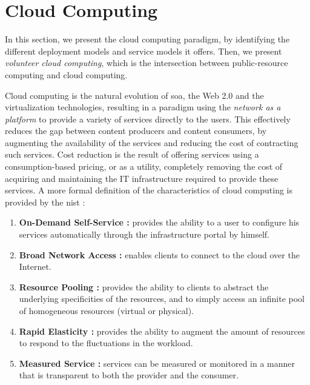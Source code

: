 \documentclass[12pt, titlepage]{uo_temp}
\begin{document}
     \section{Cloud Computing}
     In this section, we present the cloud computing paradigm, by identifying the
     different deployment models and service models it offers. Then, we present
     \emph{volunteer cloud computing}, which is the intersection between public-resource
     computing and cloud computing.

     Cloud computing is the natural evolution of \gls{soa}, the Web 2.0 and the
     virtualization technologies, resulting in a paradigm using the \emph{network as a
       platform} to provide a variety of services directly to the users. This effectively
     reduces the gap between content producers and content consumers, by augmenting the
     availability of the services and reducing the cost of contracting such services. Cost
     reduction is the result of offering services using a consumption-based pricing, or as
     a utility, completely removing the cost of acquiring and maintaining the IT
     infrastructure required to provide these services. A more formal definition of the
     characteristics of cloud computing is provided by the \gls{nist} \cite{nist}:
     \begin{enumerate}
     \item \textbf{On-Demand Self-Service :} provides the ability to a user to configure his
       services automatically through the infrastructure portal by himself.
     \item \textbf{Broad Network Access :} enables clients to connect to the cloud
       over the Internet.
     \item \textbf{Resource Pooling :} provides the ability to clients to abstract the
       underlying specificities of the resources, and to simply access an infinite pool of
       homogeneous resources (virtual or physical).
     \item \textbf{Rapid Elasticity :} provides the ability to augment the amount of
       resources to respond to the fluctuations in the workload.
     \item \textbf{Measured Service :} services can be measured or monitored in a manner
       that is transparent to both the provider and the consumer.
     \end{enumerate}
\end{document}
